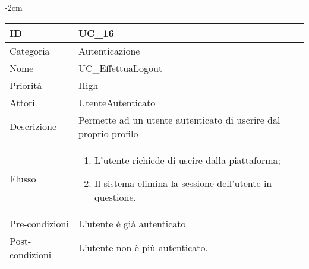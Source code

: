 \begin{center}
\begin{table}[bp]
    \centering
    \addtolength{\leftskip} {-2cm}
\begin{tabular}{ |p{2.6cm}|p{13cm}|  }
\hline
ID & UC\_16\\\hline
Categoria & Autenticazione \\\hline
Nome & UC\_EffettuaLogout \\\hline
Priorità & High \\\hline
Attori &  UtenteAutenticato \\\hline
Descrizione & Permette ad un utente autenticato di uscrire dal proprio profilo \\\hline
Flusso &  	\begin{enumerate}
			\item L'utente richiede di uscire dalla piattaforma;
			\item Il sistema elimina la sessione dell'utente in questione.
		\end{enumerate}\\\hline
Pre-condizioni &  L'utente è già autenticato\\\hline
Post-condizioni &  L'utente non è più autenticato.\\\hline
\end{tabular}
\label{table_use_case:16}\newline
\end{table}


\end{center}
